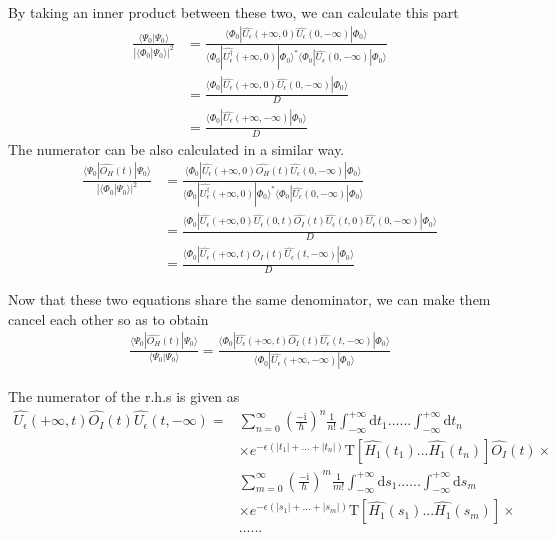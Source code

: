 By taking an inner product between these two, we can calculate this part
\begin{align}
\frac{\langle\Psi_0|\Psi_0\rangle}{|\langle\Phi_0|\Psi_0\rangle|^2}&=\frac{\langle\Phi_0|\hat{U_{\epsilon}}(+\infty,0)\hat{U_{\epsilon}}(0,-\infty)|\Phi_0\rangle}{\langle\Phi_0|\hat{U^{\dagger}_{\epsilon}}(+\infty,0)|\Phi_0\rangle^*\langle\Phi_0|\hat{U_{\epsilon}}(0,-\infty)|\Phi_0\rangle} \nonumber \\
&=\frac{\langle\Phi_0|\hat{U_{\epsilon}}(+\infty,0)\hat{U_{\epsilon}}(0,-\infty)|\Phi_0\rangle}{D} \nonumber \\
&= \frac{\langle\Phi_0|\hat{U_{\epsilon}}(+\infty,-\infty)|\Phi_0\rangle}{D} \nonumber
\end{align}
The numerator can be also calculated in a similar way.
\begin{align}
\frac{\langle\Psi_0|\hat{O_H}(t)|\Psi_0\rangle}{|\langle\Phi_0|\Psi_0\rangle|^2}&=\frac{\langle\Phi_0|\hat{U_{\epsilon}}(+\infty,0)\hat{O_H}(t)\hat{U_{\epsilon}}(0,-\infty)|\Phi_0\rangle}{\langle\Phi_0|\hat{U^{\dagger}_{\epsilon}}(+\infty,0)|\Phi_0\rangle^*\langle\Phi_0|\hat{U_{\epsilon}}(0,-\infty)|\Phi_0\rangle} \nonumber \\
&=\frac{\langle\Phi_0|\hat{U_{\epsilon}}(+\infty,0)\hat{U_{\epsilon}}(0,t)\hat{O_I}(t)\hat{U_{\epsilon}}(t,0)\hat{U_{\epsilon}}(0,-\infty)|\Phi_0\rangle}{D} \nonumber \\
&=\frac{\langle\Phi_0|\hat{U_{\epsilon}}(+\infty,t)\hat{O_I}(t)\hat{U_{\epsilon}}(t,-\infty)|\Phi_0\rangle}{D} \nonumber
\end{align}


Now that these two equations share the same denominator, we can make them cancel each other so as to obtain
\begin{align}
\frac{\langle\Psi_0|\hat{O_H}(t)|\Psi_0\rangle}{\langle\Psi_0|\Psi_0\rangle}=\frac{\langle\Phi_0|\hat{U_{\epsilon}}(+\infty,t)\hat{O_I}(t)\hat{U_{\epsilon}}(t,-\infty)|\Phi_0\rangle}{\langle\Phi_0|\hat{U_{\epsilon}}(+\infty,-\infty)|\Phi_0\rangle}\nonumber
\end{align}

The numerator  of the r.h.s is given as
\begin{align}
\hat{U_{\epsilon}}(+\infty,t)\hat{O_I}(t)\hat{U_{\epsilon}}(t,-\infty)=&\sum_{n=0}^{\infty}(\frac{-\mathrm{i}}{\hbar})^{n} \frac{1}{n!} \int_{-\infty}^{+\infty}\mathrm{d}t_1......\int_{-\infty}^{+\infty}\mathrm{d}t_{n} \nonumber \\
& \times e^{-\epsilon(|t_1|+...+|t_{n}|)}\mathrm{T}[\hat{H_1}(t_1)...\hat{H_1}(t_{n})]\hat{O_I}(t)\times \nonumber \\
& \sum_{m=0}^{\infty}(\frac{-\mathrm{i}}{\hbar})^{m} \frac{1}{m!} \int_{-\infty}^{+\infty}\mathrm{d}s_1......\int_{-\infty}^{+\infty}\mathrm{d}s_{m} \nonumber \\
& \times e^{-\epsilon(|s_1|+...+|s_{m}|)}\mathrm{T}[\hat{H_1}(s_1)...\hat{H_1}(s_{m})]\times \nonumber \\
& ...... \nonumber
\end{align}

